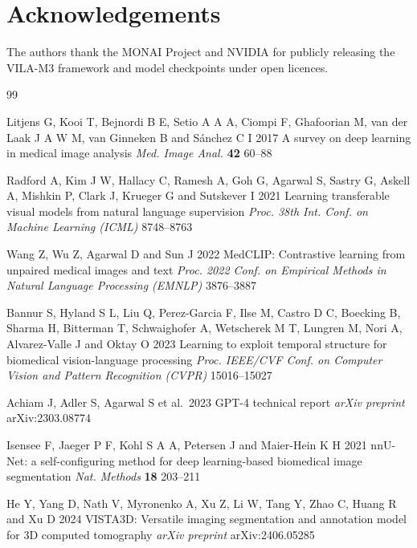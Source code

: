 \documentclass{iopconfser}
\begin{document}
\section*{Acknowledgements}

The authors thank the MONAI Project and NVIDIA for publicly releasing the
VILA-M3 framework and model checkpoints under open licences.


\begin{thebibliography}{99}

Litjens G, Kooi T, Bejnordi B E, Setio A A A, Ciompi F, Ghafoorian M,
van der Laak J A W M, van Ginneken B and S\'{a}nchez C I 2017
A survey on deep learning in medical image analysis
\textit{Med. Image Anal.} \textbf{42} 60--88

Radford A, Kim J W, Hallacy C, Ramesh A, Goh G, Agarwal S, Sastry G,
Askell A, Mishkin P, Clark J, Krueger G and Sutskever I 2021
Learning transferable visual models from natural language supervision
\textit{Proc. 38th Int. Conf. on Machine Learning (ICML)} 8748--8763

Wang Z, Wu Z, Agarwal D and Sun J 2022
MedCLIP: Contrastive learning from unpaired medical images and text
\textit{Proc. 2022 Conf. on Empirical Methods in Natural Language Processing
(EMNLP)} 3876--3887

Bannur S, Hyland S L, Liu Q, Perez-Garcia F, Ilse M, Castro D C, Boecking B,
Sharma H, Bitterman T, Schwaighofer A, Wetscherek M T, Lungren M, Nori A,
Alvarez-Valle J and Oktay O 2023
Learning to exploit temporal structure for biomedical vision-language processing
\textit{Proc. IEEE/CVF Conf. on Computer Vision and Pattern Recognition (CVPR)}
15016--15027

Achiam J, Adler S, Agarwal S et al.\ 2023
GPT-4 technical report
\textit{arXiv preprint} arXiv:2303.08774

Isensee F, Jaeger P F, Kohl S A A, Petersen J and Maier-Hein K H 2021
nnU-Net: a self-configuring method for deep learning-based biomedical image
segmentation
\textit{Nat. Methods} \textbf{18} 203--211

He Y, Yang D, Nath V, Myronenko A, Xu Z, Li W, Tang Y, Zhao C, Huang R
and Xu D 2024
VISTA3D: Versatile imaging segmentation and annotation model for 3D computed
tomography
\textit{arXiv preprint} arXiv:2406.05285


\end{thebibliography}
\end{document}
